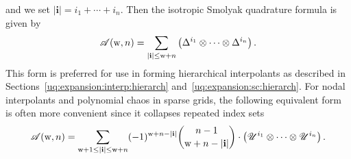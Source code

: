and we set $|\mathbf{i}| = i_1+\cdots + i_n$.
Then the isotropic Smolyak quadrature formula is given by
%
\begin{equation}\label{eq:smolyak1}
\mathscr{A}({\rm w},n) = \sum_{|\mathbf{i}| \leq {\rm w}+n}\left(\Delta^{i_1}\otimes\cdots\otimes\Delta^{i_n}\right).
\end{equation}
%
This form is preferred for use in forming hierarchical interpolants
as described in Sections~\ref{uq:expansion:interp:hierarch} 
and~\ref{uq:expansion:sc:hierarch}.  For nodal interpolants and 
polynomial chaos in sparse grids, the following equivalent 
form~\cite{was_woz} is often more convenient since it collapses 
repeated index sets
%
\begin{equation}\label{eq:smolyak2}
\mathscr{A}({\rm w},n) = \sum_{{\rm w}+1 \leq |\mathbf{i}| \leq {\rm w}+n}(-1)^{{\rm w}+n-|\mathbf{i}|}
{n-1 \choose {\rm w}+n-|\mathbf{i}|}\cdot
\left(\mathscr{U}^{i_1}\otimes\cdots\otimes\mathscr{U}^{i_n}\right).
\end{equation}

